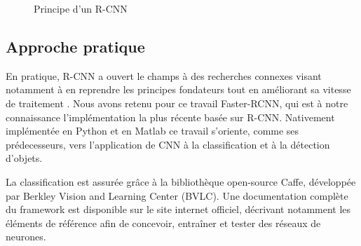       \begin{figure}[H]
	  \centering
	  \caption{ Principe d'un \gls{R-CNN} }
	  \label{fig:c2p1s1_rcnn}
      \end{figure}
     
      
    \subsection{Approche pratique}
    
      En pratique, R-CNN a ouvert le champs à des recherches connexes visant notamment à en reprendre les principes fondateurs tout en améliorant sa vitesse de traitement \cite{Bib_FastRCNN}. 
      Nous avons retenu pour ce travail Faster-RCNN\cite{Bib_FasterRCNN}, qui est à notre connaissance l'implémentation la plus récente basée sur R-CNN. 
      Nativement implémentée en Python et en Matlab ce travail s'oriente, comme ses prédecesseurs, vers l'application de CNN à la classification et à la détection d'objets.  
      
      La classification est assurée grâce à la bibliothèque open-source Caffe, développée
      par Berkley Vision and Learning Center (BVLC)\cite{Bib_CaffeHome}. Une documentation complète du framework est disponible sur le site internet 
      officiel\cite{Bib_CaffeTuto}, décrivant notamment les éléments de référence afin de concevoir, entraîner et tester des réseaux de neurones. 
      
